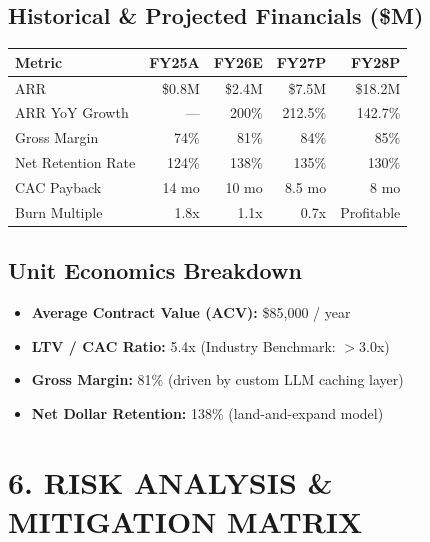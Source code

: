 \documentclass[10pt,a4paper]{article}
\begin{document}
\begin{minipage}[t]{0.52\textwidth}
  \subsection*{Historical \& Projected Financials (\$M)}
  \small
  \begin{tabularx}{\textwidth}{@{} X r r r r @{}}
    \toprule
    \textbf{Metric} & \textbf{FY25A} & \textbf{FY26E} & \textbf{FY27P} & \textbf{FY28P} \\
    \midrule
    ARR & \$0.8M & \$2.4M & \$7.5M & \$18.2M \\{}
    ARR YoY Growth & --- & 200\% & 212.5\% & 142.7\% \\{}
    Gross Margin & 74\% & 81\% & 84\% & 85\% \\{}
    Net Retention Rate & 124\% & 138\% & 135\% & 130\% \\{}
    CAC Payback & 14 mo & 10 mo & 8.5 mo & 8 mo \\{}
    Burn Multiple & 1.8x & 1.1x & 0.7x & Profitable \\
    \bottomrule
  \end{tabularx}
\end{minipage}%
\hfill
\begin{minipage}[t]{0.45\textwidth}
  \subsection*{Unit Economics Breakdown}
  \begin{tcolorbox}[enhanced, colback=lightbg, colframe=cardborder, arc=4pt, boxrule=0.8pt, top=6pt, bottom=6pt]
    \small
    \begin{itemize}[leftmargin=10pt]
      \item \textbf{Average Contract Value (ACV):} \$85,000 / year
      \item \textbf{LTV / CAC Ratio:} 5.4x (Industry Benchmark: $>$3.0x)
      \item \textbf{Gross Margin:} 81\% (driven by custom LLM caching layer)
      \item \textbf{Net Dollar Retention:} 138\% (land-and-expand model)
    \end{itemize}
  \end{tcolorbox}
\end{minipage}

\vspace{4pt}

\section*{6. RISK ANALYSIS \& MITIGATION MATRIX}
\end{document}
